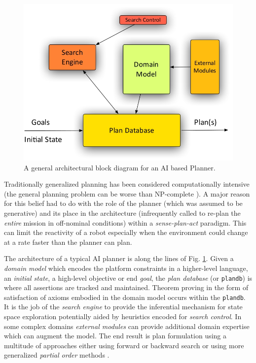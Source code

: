 \begin{figure}[!t]
 \centering
 \includegraphics[scale=2]{figs/planner-arch.jpeg}
 \caption{\small A general architectural block diagram for an AI based
   Planner.}
 \label{fig:planner}
\end{figure}

Traditionally generalized planning has been considered computationally
intensive (the general planning problem can be worse than NP-complete
\cite{ghallab04}). A major reason for this belief had to do with the
role of the planner (which was assumed to be generative) and its place
in the architecture (infrequently called to re-plan the \emph{entire}
mission in off-nominal conditions) within a \emph{sense-plan-act}
paradigm. This can limit the reactivity of a robot especially when the
environment could change at a rate faster than the planner can plan.

The architecture of a typical AI planner is along the lines of
Fig. \ref{fig:planner}. Given a \emph{domain model} which encodes the
platform constraints in a higher-level language, an \emph{initial
  state}, a high-level objective or end \emph{goal}, the \emph{plan
  database} (or \texttt{plandb}) is where all assertions are tracked
and maintained. Theorem proving in the form of satisfaction of axioms
embodied in the domain model occurs within the \texttt{plandb}. It is
the job of the \emph{search engine} to provide the inferential
mechanism for state space exploration potentially aided by heuristics
encoded for \emph{search control}. In some complex domains
\cite{mus98} \emph{external modules} can provide additional domain
expertise which can augment the model. The end result is plan
formulation using a multitude of approaches either using forward or
backward search or using more generalized \emph{partial order} methods
\cite{ghallab04}.


